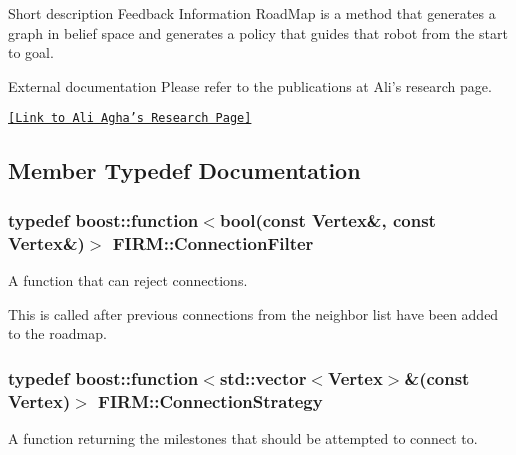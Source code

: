 \label{class_f_i_r_m_FIRM}%
\hypertarget{class_f_i_r_m_FIRM}{}%
 \begin{DoxyParagraph}{\-Short description}
\-Feedback \-Information \-Road\-Map is a method that generates a graph in belief space and generates a policy that guides that robot from the start to goal.
\end{DoxyParagraph}
\begin{DoxyParagraph}{\-External documentation}
\-Please refer to the publications at \-Ali's research page.
\end{DoxyParagraph}
\href{http://www.mit.edu/~aliagha/Web/publications.htm}{\tt \mbox{[}\-Link to \-Ali \-Agha's \-Research \-Page\mbox{]}} 

\subsection{\-Member \-Typedef \-Documentation}
\hypertarget{class_f_i_r_m_a2482eee2e5248d5bff3b3b56e5a593b3}{
\subsubsection[{\-Connection\-Filter}]{\setlength{\rightskip}{0pt plus 5cm}typedef boost\-::function$<$bool(const \-Vertex\&, const \-Vertex\&)$>$ {\bf \-F\-I\-R\-M\-::\-Connection\-Filter}}}\label{class_f_i_r_m_a2482eee2e5248d5bff3b3b56e5a593b3}


\-A function that can reject connections. 

\-This is called after previous connections from the neighbor list have been added to the roadmap. \hypertarget{class_f_i_r_m_a15cfbcaf52c0bdd5e6c1a969bbf7ea1e}{
\subsubsection[{\-Connection\-Strategy}]{\setlength{\rightskip}{0pt plus 5cm}typedef boost\-::function$<$std\-::vector$<$\-Vertex$>$\&(const \-Vertex)$>$ {\bf \-F\-I\-R\-M\-::\-Connection\-Strategy}}}\label{class_f_i_r_m_a15cfbcaf52c0bdd5e6c1a969bbf7ea1e}


\-A function returning the milestones that should be attempted to connect to. 


